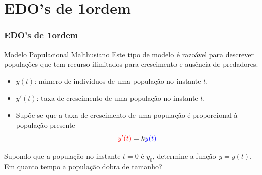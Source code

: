 \section{EDO's de 1\textordfeminine ordem}


\begin{frame}
\frametitle{ EDO's de 1\textordfeminine ordem}



\end{frame}


\begin{frame}{ }
	
	\begin{exampleblock}{Modelo Populacional Malthusiano}
		Este tipo de modelo é razoável para descrever populações que tem {\color{cyan}recurso ilimitados para crescimento e ausência de predadores}. 
		\begin{itemize}
			\item {\color{blue}$y(t)$}: número de indivíduos de uma população no instante $t$.
			\item {\color{red}$y'(t)$}: taxa de crescimento de uma população no instante $t$.
			
			\item Supõe-se que a {\color{red} taxa de crescimento} de uma população é proporcional à {\color{blue} população presente} 
			\[{\color{red}y'(t)}=k{\color{blue}y(t)}\]
		\end{itemize}
		
		
		\medskip
		
		Supondo que a população no instante $t=0$ é $y_0$, determine a função $y=y(t)$. Em quanto tempo a população dobra de tamanho?
	\end{exampleblock}
\end{frame}



